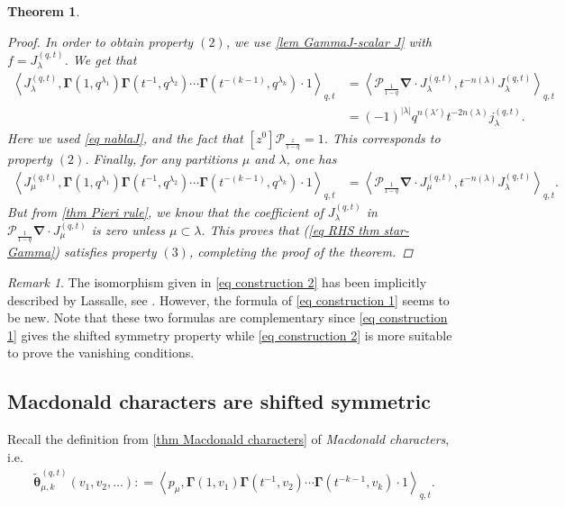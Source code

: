 \documentclass[12pt]{amsart}
\newtheorem{thm}{Theorem}[section]
\theoremstyle{remark}
\newtheorem{rmq}{Remark}
\newcommand{\Mch}{\boldsymbol{\widetilde\theta}^{(q,t)}}
\newcommand{\J}{{J}^{(q,t)}}
\newcommand{\normJ}{{j}^{(q,t)}}
\newcommand{\nablaJ}{\boldsymbol{\nabla}}
\newcommand{\GammaJ}{\boldsymbol{\Gamma}}
\newcommand{\Pop}{\mathcal{P}}
\begin{document}
\begin{thm}
\begin{proof}
In order to obtain property $(2)$, we use \cref{lem GammaJ-scalar J} with $f=\J_\lambda$. We get that 
\begin{align*}
  \left\langle \J_\lambda,\GammaJ(1,q^{\lambda_1})\GammaJ(t^{-1},q^{\lambda_2})\cdots \GammaJ(t^{-(k-1)} ,q^{\lambda_{k}})\cdot 1\right\rangle_{q,t}
  &=\left\langle\Pop_{\frac{1}{1-q}}\nablaJ\cdot \J_\lambda,t^{-n(\lambda)}\J_\lambda\right\rangle _{q,t}\\
  &=(-1)^{|\lambda|}q^{n(\lambda')}t^{-2n(\lambda)}\normJ_\lambda.
\end{align*}
Here we used \cref{eq nablaJ}, and the fact that $[z^0]\Pop_{\frac{z}{1-q}}=1$. 
 This corresponds to property $(2)$.
Finally, for any partitions $\mu$ and $\lambda$, one has
\begin{align*}
  \left\langle \J_\mu,\GammaJ(1,q^{\lambda_1})\GammaJ(t^{-1},q^{\lambda_2})\cdots \GammaJ(t^{-(k-1)} ,q^{\lambda_{k}})\cdot 1 \right\rangle_{q,t}
  &=\left\langle\Pop_{\frac{1}{1-q}}\nablaJ\cdot \J_\mu,t^{-n(\lambda)}\J_\lambda\right\rangle _{q,t}.
\end{align*}
But from \cref{thm Pieri rule}, we know that the coefficient of $\J_\lambda$ in $\Pop_{\frac{1}{1-q}}\nablaJ\cdot \J_\mu$ is zero unless $\mu\subset \lambda$.   This proves that (\ref{eq RHS thm star-Gamma}) satisfies property $(3)$, completing the proof of the theorem.
\end{proof}
\end{thm}

\begin{rmq}
    The isomorphism given in \cref{eq construction 2} has been implicitly described by Lassalle, see \cite[Definition 1]{Lassalle1998}. However, the formula of \cref{eq construction 1} seems to be new. Note that these two formulas are complementary since \cref{eq construction 1} gives the shifted symmetry property while \cref{eq construction 2} is more suitable to prove the vanishing conditions.
\end{rmq}

\subsection{Macdonald characters are shifted symmetric}\label{ssec characters}

Recall the definition from \cref{thm Macdonald characters} of \emph{Macdonald characters}, i.e.
\begin{align*}
	\Mch_{\mu,k}(v_1,v_2,\dots ):
	=\left\langle p_\mu,\GammaJ(1,v_1)\GammaJ(t^{-1},v_2)\cdots \GammaJ(t^{-{k-1}},v_k) \cdot 1\right\rangle_{q,t}.
\end{align*}
\end{document}
